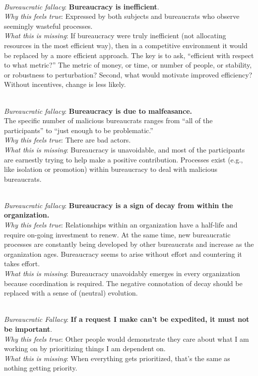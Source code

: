\ \\
\textit{Bureaucratic fallacy}: \textbf{Bureaucracy is inefficient}. \\
\textit{Why this feels true}: Expressed by both subjects and bureaucrats who observe seemingly wasteful processes.\\
\textit{What this is missing}: If bureaucracy were truly inefficient (not allocating resources in the most efficient way), then in a competitive environment it would be replaced by a more efficient approach. The key is to ask, ``efficient with respect to what metric?'' The metric of money, or time, or number of people, or stability, or robustness to perturbation?  Second, what would motivate improved efficiency? Without incentives, change is less likely. 

\ \\
\textit{Bureaucratic fallacy}: \textbf{Bureaucracy is due to malfeasance.}\\
The specific number of malicious bureaucrats ranges from ``all of the participants'' to ``just enough to be problematic.'' \\
\textit{Why this feels true}: There are bad actors. \\
\textit{What this is missing}: Bureaucracy is unavoidable, and most of the participants are earnestly trying to help make a positive contribution. Processes exist (e.g., like isolation or promotion) within bureaucracy to deal with malicious bureaucrats. 

\ \\
\textit{Bureaucratic fallacy}: \textbf{Bureaucracy is a sign of decay from within the organization.} \\
\textit{Why this feels true}: Relationships within an organization have a half-life and require on-going investment to renew. At the same time, new bureaucratic processes are constantly being developed by other bureaucrats and increase as the organization ages. Bureaucracy seems to arise without effort and countering it takes effort.  \\
\textit{What this is missing}: Bureaucracy unavoidably emerges in every organization because coordination is required. The negative connotation of decay should be replaced with a sense of (neutral) evolution.

\ \\
\textit{Bureaucratic Fallacy}: \textbf{If a request I make can't be expedited, it must not be important}.  \\
\textit{Why this feels true}: Other people would demonstrate they care about what I am working on by prioritizing things I am dependent on.\\
\textit{What this is missing}: When everything gets prioritized, that's the same as nothing getting priority.

